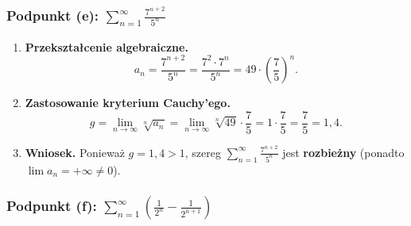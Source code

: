\subsubsection*{Podpunkt (e): $\displaystyle \sum_{n=1}^{\infty} \frac{7^{n+2}}{5^n}$}

\begin{enumerate}[label=\textbf{Krok \arabic*.},leftmargin=*]
    \item \textbf{Przekształcenie algebraiczne.}
    \begin{equation*}
        a_n = \frac{7^{n+2}}{5^n} = \frac{7^2 \cdot 7^n}{5^n} = 49 \cdot \left(\frac{7}{5}\right)^n.
    \end{equation*}
    \item \textbf{Zastosowanie kryterium Cauchy'ego.}
    \begin{equation*}
        g = \lim_{n \to \infty} \sqrt[n]{a_n} = \lim_{n \to \infty} \sqrt[n]{49} \cdot \frac{7}{5} = 1 \cdot \frac{7}{5} = \frac{7}{5} = 1{,}4.
    \end{equation*}
    \item \textbf{Wniosek.}
    Ponieważ $g = 1{,}4 > 1$, szereg $\displaystyle\sum_{n=1}^{\infty} \frac{7^{n+2}}{5^n}$ jest \textbf{rozbieżny} (ponadto $\lim a_n = +\infty \neq 0$).
\end{enumerate}

\subsubsection*{Podpunkt (f): $\displaystyle \sum_{n=1}^{\infty} \left(\frac{1}{2^n} - \frac{1}{2^{n+1}}\right)$}

